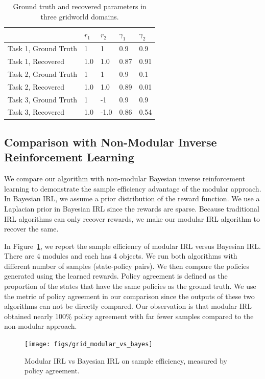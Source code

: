 \documentclass[12pt]{report}	%
\theoremstyle{definition}
\theoremstyle{remark}
\begin{document}
\begin{table}[h]
\centering
\begin{tabular}{l | l l l l}
\hline
 & $r_1$ & $r_2$ & $\gamma_1$ & $\gamma_2$\\
\hline
Task 1, Ground Truth & 1 & 1 & 0.9 & 0.9 \\
Task 1, Recovered & 1.0 & 1.0 & 0.87 & 0.91 \\
\hline
Task 2, Ground Truth & 1 & 1 & 0.9 & 0.1 \\
Task 2, Recovered & 1.0 & 1.0 & 0.89 & 0.01 \\
\hline
Task 3, Ground Truth & 1 & -1 & 0.9 & 0.9 \\
Task 3, Recovered & 1.0 & -1.0 & 0.86 & 0.54 \\
\hline
\end{tabular}
\caption{Ground truth and recovered parameters in three gridworld domains.}
\label{tbl:sanity}
\end{table}

\subsection{Comparison with Non-Modular Inverse Reinforcement Learning}

We compare our algorithm with non-modular Bayesian inverse reinforcement
learning \cite{ramachandran2007bayesian} to demonstrate the sample efficiency
advantage of the modular approach.
In Bayesian IRL, we assume a prior distribution of the reward function. We use a
Laplacian prior in Bayesian IRL since the rewards are sparse. Because
traditional IRL algorithms can only recover rewards, we make our modular IRL
algorithm to recover the same.

In Figure~\ref{fig:mVSb}, we report the sample
efficiency of modular IRL versus Bayesian IRL. There are 4 modules and
each has 4 objects. We run both algorithms with different number of samples
(state-policy pairs). We then compare the policies generated using the learned
rewards. Policy agreement is defined as the proportion of the states that have
the same policies as the ground truth. We use the metric of policy agreement in
our comparison since the outputs of these two algorithms can not be directly
compared. Our observation is that modular IRL obtained nearly 100\% policy
agreement with far fewer samples compared to the non-modular approach.

\begin{figure}[h]
\centering
\texttt{[image: figs/grid\_modular\_vs\_bayes]}
\caption{Modular IRL vs Bayesian IRL on sample efficiency, measured by policy agreement.}
\label{fig:mVSb}
\end{figure}
\end{document}
